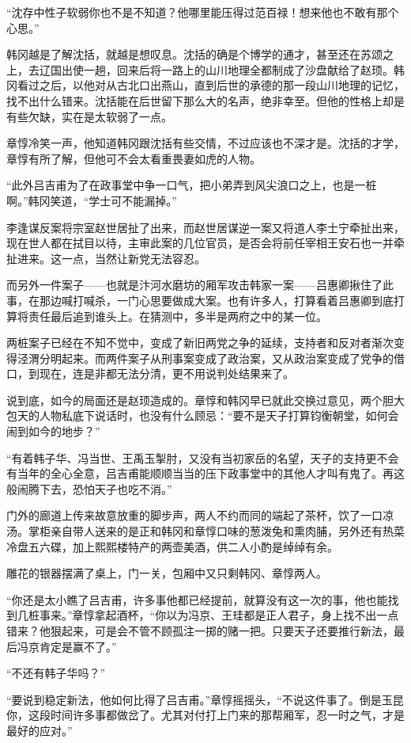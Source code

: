 “沈存中性子软弱你也不是不知道？他哪里能压得过范百禄！想来他也不敢有那个心思。”

韩冈越是了解沈括，就越是想叹息。沈括的确是个博学的通才，甚至还在苏颂之上，去辽国出使一趟，回来后将一路上的山川地理全都制成了沙盘献给了赵顼。韩冈看过之后，以他对从古北口出燕山，直到后世的承德的那一段山川地理的记忆，找不出什么错来。沈括能在后世留下那么大的名声，绝非幸至。但他的性格上却是有些欠缺，实在是太软弱了一点。

章惇冷笑一声，他知道韩冈跟沈括有些交情，不过应该也不深才是。沈括的才学，章惇有所了解，但他可不会太看重畏妻如虎的人物。

“此外吕吉甫为了在政事堂中争一口气，把小弟弄到风尖浪口之上，也是一桩啊。”韩冈笑道，“学士可不能漏掉。”

李逢谋反案将宗室赵世居扯了出来，而赵世居谋逆一案又将道人李士宁牵扯出来，现在世人都在拭目以待，主审此案的几位官员，是否会将前任宰相王安石也一并牵扯进来。这一点，当然让新党无法容忍。

而另外一件案子——也就是汴河水磨坊的厢军攻击韩家一案——吕惠卿揪住了此事，在那边喊打喊杀，一门心思要做成大案。也有许多人，打算看着吕惠卿到底打算将责任最后追到谁头上。在猜测中，多半是两府之中的某一位。

两桩案子已经在不知不觉中，变成了新旧两党之争的延续，支持者和反对者渐次变得泾渭分明起来。而两件案子从刑事案变成了政治案，又从政治案变成了党争的借口，到现在，连是非都无法分清，更不用说判处结果来了。

说到底，如今的局面还是赵顼造成的。章惇和韩冈早已就此交换过意见，两个胆大包天的人物私底下说话时，也没有什么顾忌：“要不是天子打算钧衡朝堂，如何会闹到如今的地步？”

“有着韩子华、冯当世、王禹玉掣肘，又没有当初家岳的名望，天子的支持更不会有当年的全心全意，吕吉甫能顺顺当当的压下政事堂中的其他人才叫有鬼了。再这般闹腾下去，恐怕天子也吃不消。”

门外的廊道上传来故意放重的脚步声，两人不约而同的端起了茶杯，饮了一口凉汤。掌柜亲自带人送来的是正和韩冈和章惇口味的葱泼兔和熏肉脯，另外还有热菜冷盘五六碟，加上熙熙楼特产的两壶美酒，供二人小酌是绰绰有余。

雕花的银器摆满了桌上，门一关，包厢中又只剩韩冈、章惇两人。

“你还是太小瞧了吕吉甫，许多事他都已经提前，就算没有这一次的事，他也能找到几桩事来。”章惇拿起酒杯，“你以为冯京、王珪都是正人君子，身上找不出一点错来？他狠起来，可是会不管不顾孤注一掷的赌一把。只要天子还要推行新法，最后冯京肯定是赢不了。”

“不还有韩子华吗？”

“要说到稳定新法，他如何比得了吕吉甫。”章惇摇摇头，“不说这件事了。倒是玉昆你，这段时间许多事都做岔了。尤其对付打上门来的那帮厢军，忍一时之气，才是最好的应对。”

